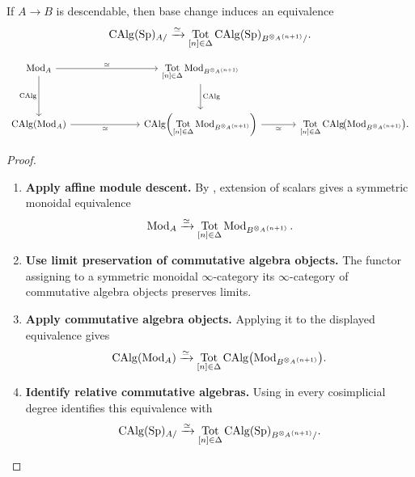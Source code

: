 \begin{theorem}
\label{thm:spectral-affine-algebra-descent}
If $A\to B$ is descendable, then base change induces an equivalence
\[
    \operatorname{CAlg}(\operatorname{Sp})_{A/}
    \xrightarrow{\simeq}
    \operatorname*{Tot}_{[n]\in\Delta}
    \operatorname{CAlg}(\operatorname{Sp})_{B^{\otimes_A(n+1)}/}.
\]
\end{theorem}

\[
\begin{tikzcd}[column sep=large, row sep=large]
    \Mod_A
        \arrow[rr, "\simeq"]
        \arrow[d, "\CAlg"']
    &&
    \displaystyle
    \operatorname*{Tot}_{[n]\in\Delta}
    \Mod_{B^{\otimes_A(n+1)}}
        \arrow[d, "\CAlg"]
    \\
    \CAlg(\Mod_A)
        \arrow[rr, "\simeq"']
    &&
    \displaystyle
    \CAlg\!\left(
        \operatorname*{Tot}_{[n]\in\Delta}
        \Mod_{B^{\otimes_A(n+1)}}
    \right)
        \arrow[r, "\simeq"']
    &
    \displaystyle
    \operatorname*{Tot}_{[n]\in\Delta}
    \CAlg\!\bigl(\Mod_{B^{\otimes_A(n+1)}}\bigr).
\end{tikzcd}
\]


\begin{proof}
\leavevmode
\begin{enumerate}[label=\textup{(\arabic*)}]
    \item \textbf{Apply affine module descent.}
    By , extension of scalars gives a
    symmetric monoidal equivalence
    \[
        \operatorname{Mod}_A
        \xrightarrow{\simeq}
        \operatorname*{Tot}_{[n]\in\Delta}
        \operatorname{Mod}_{B^{\otimes_A(n+1)}}.
    \]

    \item \textbf{Use limit preservation of commutative algebra objects.}
    The functor assigning to a symmetric monoidal $\infty$-category its
    $\infty$-category of commutative algebra objects preserves limits.

    \item \textbf{Apply commutative algebra objects.}
    Applying it to the displayed equivalence gives
    \[
        \operatorname{CAlg}(\operatorname{Mod}_A)
        \xrightarrow{\simeq}
        \operatorname*{Tot}_{[n]\in\Delta}
        \operatorname{CAlg}
        \bigl(
            \operatorname{Mod}_{B^{\otimes_A(n+1)}}
        \bigr).
    \]

    \item \textbf{Identify relative commutative algebras.}
    Using
     in every cosimplicial
    degree identifies this equivalence with
    \[
        \operatorname{CAlg}(\operatorname{Sp})_{A/}
        \xrightarrow{\simeq}
        \operatorname*{Tot}_{[n]\in\Delta}
        \operatorname{CAlg}(\operatorname{Sp})_{B^{\otimes_A(n+1)}/}.
    \]
\end{enumerate}
\end{proof}

